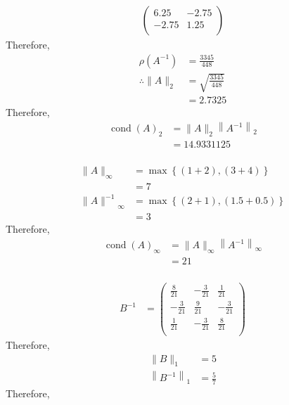 \documentclass[fleqn, a4paper, 11pt, oneside]{amsart}
\theoremstyle{definition}
\theoremstyle{theorem}
\DeclareMathOperator{\cond}{cond}
\begin{document}
\begin{solution}
\begin{align*}
			\begin{pmatrix}
				6.25  & -2.75 \\
				-2.75 & 1.25  \\
			\end{pmatrix}
	\end{align*}
	Therefore,
	\begin{align*}
		\rho\left( A^{-1} \right) & = \frac{3345}{448}        \\
		\therefore \|A\|_2        & = \sqrt{\frac{3345}{448}} \\
                                          & = 2.7325
	\end{align*}
	Therefore,
	\begin{align*}
		\cond(A)_2 & = \|A\|_2 \left\| A^{-1} \right\|_2 \\
                           & = 14.9331125
	\end{align*}
	~\\
	\begin{align*}
		\|A\|_{\infty}        & = \max\left\{ (1 + 2) , (3 + 4) \right\}     \\
                                      & = 7                                          \\
		{\|A\|^{-1}}_{\infty} & = \max\left\{ (2 + 1) , (1.5 + 0.5) \right\} \\
                                      & = 3
	\end{align*}
	Therefore,
	\begin{align*}
		\cond(A)_{\infty} & = \|A\|_{\infty} \left\| A^{-1} \right\|_{\infty} \\
                                  & = 21
	\end{align*}
	~\\
	\begin{align*}
		B^{-1} &=
			\begin{pmatrix}
				\frac{8}{21}  & -\frac{3}{21} & \frac{1}{21}  \\
				-\frac{3}{21} & \frac{9}{21}  & -\frac{3}{21} \\
				\frac{1}{21}  & -\frac{3}{21} & \frac{8}{21}  \\
			\end{pmatrix}
	\end{align*}
	Therefore,
	\begin{align*}
		\|B\|_1                   & = 5 \\
		\left\| B^{-1} \right\|_1 & = \frac{5}{7}
	\end{align*}
	Therefore,
	\begin{align*}

\end{align*}
\end{solution}
\end{document}
